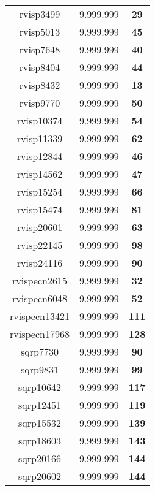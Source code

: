 \begin{tabular}{cc||c}
rvisp3499        & 9.999.999        & {\bf 29}        \\ 
rvisp5013        & 9.999.999        & {\bf 45}        \\ 
rvisp7648        & 9.999.999        & {\bf 40}        \\ 
rvisp8404        & 9.999.999        & {\bf 44}        \\ 
rvisp8432        & 9.999.999        & {\bf 13}        \\ 
rvisp9770        & 9.999.999        & {\bf 50}        \\ 
rvisp10374       & 9.999.999        & {\bf 54}        \\ 
rvisp11339       & 9.999.999        & {\bf 62}        \\ 
rvisp12844       & 9.999.999        & {\bf 46}        \\ 
rvisp14562       & 9.999.999        & {\bf 47}        \\ 
rvisp15254       & 9.999.999        & {\bf 66}        \\ 
rvisp15474       & 9.999.999        & {\bf 81}        \\ 
rvisp20601       & 9.999.999        & {\bf 63}        \\ 
rvisp22145       & 9.999.999        & {\bf 98}        \\ 
rvisp24116       & 9.999.999        & {\bf 90}        \\ 
rvispecn2615     & 9.999.999        & {\bf 32}        \\ 
rvispecn6048     & 9.999.999        & {\bf 52}        \\ 
rvispecn13421    & 9.999.999        & {\bf 111}       \\ 
rvispecn17968    & 9.999.999        & {\bf 128}       \\ 
sqrp7730         & 9.999.999        & {\bf 90}        \\ 
sqrp9831         & 9.999.999        & {\bf 99}        \\ 
sqrp10642        & 9.999.999        & {\bf 117}       \\ 
sqrp12451        & 9.999.999        & {\bf 119}       \\ 
sqrp15532        & 9.999.999        & {\bf 139}       \\ 
sqrp18603        & 9.999.999        & {\bf 143}       \\ 
sqrp20166        & 9.999.999        & {\bf 144}       \\ 
sqrp20602        & 9.999.999        & {\bf 144}       \\ 

\end{tabular}
